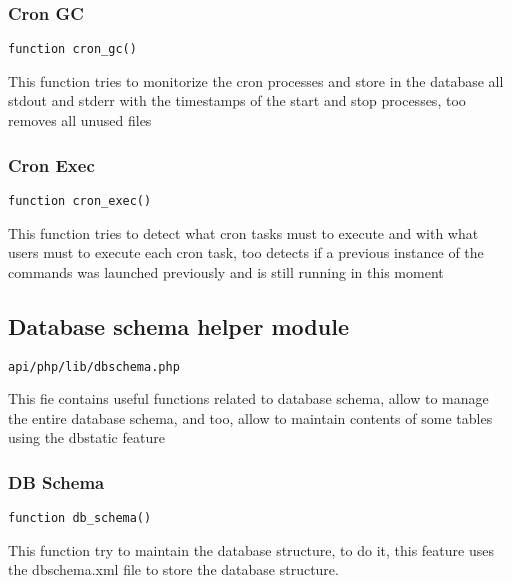 \documentclass[a4paper]{article}
\begin{document}
\hypertarget{toc404}{}
\subsubsection{Cron GC}

\begin{lstlisting}
function cron_gc()
\end{lstlisting}

This function tries to monitorize the cron processes and store in the database
all stdout and stderr with the timestamps of the start and stop processes, too
removes all unused files

\hypertarget{toc405}{}
\subsubsection{Cron Exec}

\begin{lstlisting}
function cron_exec()
\end{lstlisting}

This function tries to detect what cron tasks must to execute and with what
users must to execute each cron task, too detects if a previous instance of
the commands was launched previously and is still running in this moment

\hypertarget{toc406}{}
\subsection{Database schema helper module}

\begin{lstlisting}
api/php/lib/dbschema.php
\end{lstlisting}

This fie contains useful functions related to database schema, allow to manage the entire database
schema, and too, allow to maintain contents of some tables using the dbstatic feature

\hypertarget{toc407}{}
\subsubsection{DB Schema}

\begin{lstlisting}
function db_schema()
\end{lstlisting}

This function try to maintain the database structure, to do it, this feature uses the dbschema.xml
file to store the database structure.
\end{document}
